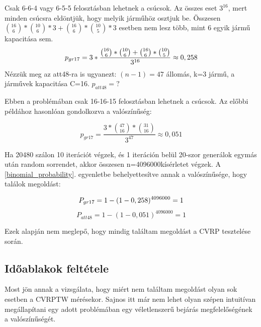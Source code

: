 Csak 6-6-4 vagy 6-5-5 felosztásban lehetnek a csúcsok. Az összes eset \(3^{16}\), mert minden csúcsra eldöntjük, hogy melyik járműhöz osztjuk be. Összesen \(\binom{16}{6}*\binom{10}{6}*3 + \binom{16}{6}*\binom{10}{5}*3 \) esetben nem lesz több, mint 6 egyik jármű kapacitása sem.
\begin{equation}
	p_{gr17} = 3*\frac{\binom{16}{6}*\binom{10}{6} + \binom{16}{6}*\binom{10}{5}}{3^{16}} \approx 0,258
	\label{gr17_p}
\end{equation}
Nézzük meg az att48-ra is ugyanezt: \((n-1)=47\) állomás, k=3 jármű, a járművek kapacitása C=16. \(p_{att48}=?\)

\newcommand{\patt}{0,051}

Ebben a problémában csak 16-16-15 felosztásban lehetnek a csúcsok. Az előbbi példához hasonlóan gondolkozva a valószínűség:

\begin{equation}
	p_{gr17} = \frac{3*\binom{47}{16}*\binom{31}{16}}{3^{47}} \approx \patt
	\label{att48_p}
\end{equation}

\newcommand{\nInTenIterations}{4096000}

Ha 20480 szálon 10 iterációt végzek, és 1 iteráción belül 20-szor generálok egymás után random sorrendet, akkor összesen n=\nInTenIterations kísérletet végzek. A \ref{binomial_probability}. egyenletbe behelyettesítve annak a valószínűsége, hogy találok megoldást:

\begin{equation}
	P_{gr17} = 1-(1-\pgr)^{\nInTenIterations} = 1
	\label{gr17_P}
\end{equation}
\begin{equation}
	P_{att48} = 1-(1-\patt)^{\nInTenIterations} = 1
	\label{att48_P}
\end{equation}

Ezek alapján nem meglepő, hogy mindig találtam megoldást a CVRP tesztelése során.

\subsection{Időablakok feltétele}
Most jön annak a vizsgálata, hogy miért nem találtam megoldást olyan sok esetben a CVRPTW mérésekor. Sajnos itt már nem lehet olyan szépen intuitívan megállapítani egy adott problémában egy véletlenszerű bejárás megfelelőségének a valószínűségét. 